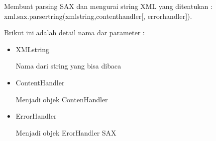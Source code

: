 \vspace{12pt} 
Membuat parsing SAX dan mengurai string XML yang ditentukan : 
{\fontsize{10pt}{10pt}\selectfont xml.sax.parsertring(xmlstring,contenthandler[, errorhandler])}.
 
\vspace{12pt}
Brikut ini adalah detail nama dar parameter : 
\begin{itemize}
\item {XMLstring} 

Nama dari string yang bisa dibaca 
 
\item {ContentHandler} 

Menjadi objek ContenHandler 
 
\item {ErrorHandler} 

Menjadi objek ErorHandler SAX 
\end{itemize}

